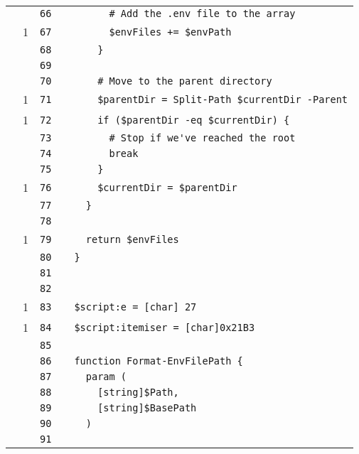 \documentclass[a4paper,landscape,10pt]{article}
\begin{document}
\begin{longtable}[l]{lrrll}
\cellcolor{gray} &  & \verb~66~ & & \verb~      # Add the .env file to the array~\\
\cellcolor{green} & 1 & \verb~67~ & & \verb~      $envFiles += $envPath~\\
\cellcolor{gray} &  & \verb~68~ & & \verb~    }~\\
\cellcolor{gray} &  & \verb~69~ & & \verb~~\\
\cellcolor{gray} &  & \verb~70~ & & \verb~    # Move to the parent directory~\\
\cellcolor{green} & 1 & \verb~71~ & & \verb~    $parentDir = Split-Path $currentDir -Parent~\\
\cellcolor{green} & 1 & \verb~72~ & & \verb~    if ($parentDir -eq $currentDir) {~\\
\cellcolor{gray} &  & \verb~73~ & & \verb~      # Stop if we've reached the root~\\
\cellcolor{gray} &  & \verb~74~ & & \verb~      break~\\
\cellcolor{gray} &  & \verb~75~ & & \verb~    }~\\
\cellcolor{green} & 1 & \verb~76~ & & \verb~    $currentDir = $parentDir~\\
\cellcolor{gray} &  & \verb~77~ & & \verb~  }~\\
\cellcolor{gray} &  & \verb~78~ & & \verb~~\\
\cellcolor{green} & 1 & \verb~79~ & & \verb~  return $envFiles~\\
\cellcolor{gray} &  & \verb~80~ & & \verb~}~\\
\cellcolor{gray} &  & \verb~81~ & & \verb~~\\
\cellcolor{gray} &  & \verb~82~ & & \verb~~\\
\cellcolor{green} & 1 & \verb~83~ & & \verb~$script:e = [char] 27~\\
\cellcolor{green} & 1 & \verb~84~ & & \verb~$script:itemiser = [char]0x21B3~\\
\cellcolor{gray} &  & \verb~85~ & & \verb~~\\
\cellcolor{gray} &  & \verb~86~ & & \verb~function Format-EnvFilePath {~\\
\cellcolor{gray} &  & \verb~87~ & & \verb~  param (~\\
\cellcolor{gray} &  & \verb~88~ & & \verb~    [string]$Path,~\\
\cellcolor{gray} &  & \verb~89~ & & \verb~    [string]$BasePath~\\
\cellcolor{gray} &  & \verb~90~ & & \verb~  )~\\
\cellcolor{gray} &  & \verb~91~ & & \verb~~\\

\end{longtable}
\end{document}
